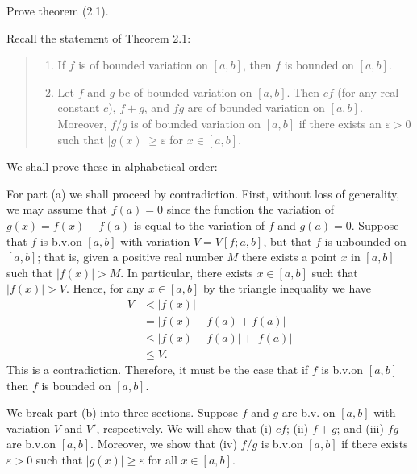 \begin{problem}
  Prove theorem (2.1).
\end{problem}
\begin{solution}
  Recall the statement of Theorem 2.1:
  \begin{quote}
    \begin{enumerate}[label=(\alph*),noitemsep]
    \item If \(f\) is of bounded variation on \([a,b]\), then \(f\) is bounded on
      \([a,b]\).
    \item Let \(f\) and \(g\) be of bounded variation on \([a,b]\). Then
      \(cf\) (for any real constant \(c\)), \(f+g\), and \(fg\) are of
      bounded variation on \([a,b]\). Moreover, \(f/g\) is of bounded
      variation on \([a,b]\) if there exists an \(\varepsilon>0\) such that
      \(|g(x)|\geq\varepsilon\) for \(x\in[a,b]\).
    \end{enumerate}
  \end{quote}
  \noindent%
  We shall prove these in alphabetical order:

  For part (a) we shall proceed by contradiction. First, without loss of
  generality, we may assume that \(f(a)=0\) since the function the
  variation of \(g(x)=f(x)-f(a)\) is equal to the variation of \(f\) and
  \(g(a)=0\).  Suppose that \(f\) is b.v.\@ on \([a,b]\) with variation
  \(V=V[f;a,b]\), but that \(f\) is unbounded on \([a,b]\); that is, given
  a positive real number \(M\) there exists a point \(x\) in \([a,b]\) such
  that \(|f(x)|>M\). In particular, there exists \(x\in[a,b]\) such that
  \(|f(x)|>V\). Hence, for any \(x\in[a,b]\) by the triangle inequality we
  have
  \begin{align*}
    V&<|f(x)|\\
     &=|f(x)-f(a)+f(a)|\\
     &\leq|f(x)-f(a)|+|f(a)|\\
     &\leq V.
  \end{align*}
  This is a contradiction. Therefore, it must be the case that if \(f\) is
  b.v.\@ on \([a,b]\) then \(f\) is bounded on \([a,b]\).

  We break part (b) into three sections. Suppose \(f\) and \(g\) are b.v.\@
  on \([a,b]\) with variation \(V\) and \(V'\), respectively.  We will show
  that (i) \(cf\); (ii) \(f+g\); and (iii) \(fg\) are b.v.\@ on
  \([a,b]\). Moreover, we show that (iv) \(f/g\) is b.v.\@ on \([a,b]\) if
  there exists \(\varepsilon>0\) such that \(|g(x)|\geq\varepsilon\) for
  all \(x\in[a,b]\).


\end{solution}
